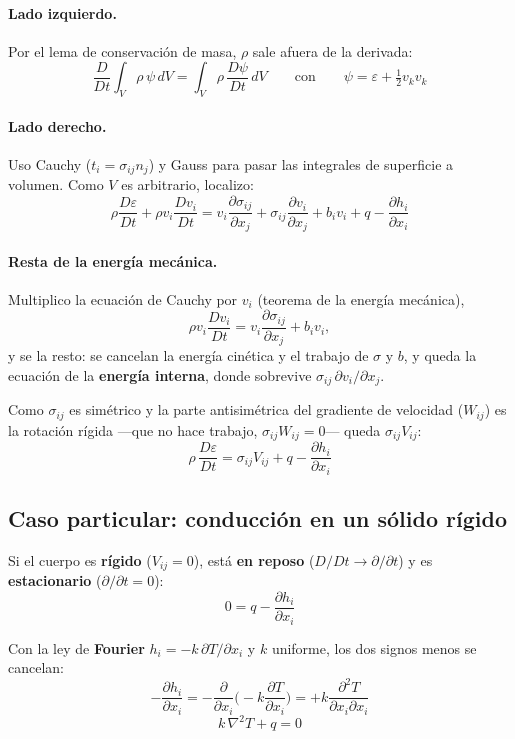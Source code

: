 \documentclass[11pt,a4paper]{article}
\begin{document}
\paragraph{Lado izquierdo.} Por el lema de conservación de masa, $\rho$ sale afuera
de la derivada:
\[
\frac{D}{Dt}\int_V\rho\,\psi\,dV=\int_V\rho\,\frac{D\psi}{Dt}\,dV
\qquad\text{con}\qquad \psi=\varepsilon+\tfrac12 v_kv_k
\]

\paragraph{Lado derecho.} Uso Cauchy ($t_i=\sigma_{ij}n_j$) y Gauss para pasar las
integrales de superficie a volumen. Como $V$ es arbitrario, localizo:
\[
\rho\frac{D\varepsilon}{Dt}+\rho v_i\frac{Dv_i}{Dt}
=v_i\frac{\partial\sigma_{ij}}{\partial x_j}+\sigma_{ij}\frac{\partial v_i}{\partial x_j}
+b_iv_i+q-\frac{\partial h_i}{\partial x_i}
\]

\paragraph{Resta de la energía mecánica.} Multiplico la ecuación de Cauchy por $v_i$
(teorema de la energía mecánica),
\[
\rho v_i\frac{Dv_i}{Dt}=v_i\frac{\partial\sigma_{ij}}{\partial x_j}+b_iv_i ,
\]
y se la resto: se cancelan la energía cinética y el trabajo de $\sigma$ y $b$, y queda
la ecuación de la \textbf{energía interna}, donde sobrevive $\sigma_{ij}\,\partial v_i/\partial x_j$.

Como $\sigma_{ij}$ es simétrico y la parte antisimétrica del gradiente de velocidad
($W_{ij}$) es la rotación rígida —que no hace trabajo, $\sigma_{ij}W_{ij}=0$— queda
$\sigma_{ij}V_{ij}$:
\[
\boxed{\ \rho\,\frac{D\varepsilon}{Dt}=\sigma_{ij}V_{ij}+q-\frac{\partial h_i}{\partial x_i}\ }
\]

\subsection*{Caso particular: conducción en un sólido rígido}

Si el cuerpo es \textbf{rígido} ($V_{ij}=0$), está \textbf{en reposo}
($D/Dt\to\partial/\partial t$) y es \textbf{estacionario} ($\partial/\partial t=0$):
\[
0=q-\frac{\partial h_i}{\partial x_i}
\]

Con la ley de \textbf{Fourier} $h_i=-k\,\partial T/\partial x_i$ y $k$ uniforme,
los dos signos menos se cancelan:
\[
-\frac{\partial h_i}{\partial x_i}
=-\frac{\partial}{\partial x_i}\Big(-k\frac{\partial T}{\partial x_i}\Big)
=+k\frac{\partial^2 T}{\partial x_i\partial x_i}
\]
\[
\boxed{\ k\,\nabla^2 T+q=0\ }
\]
\end{document}
